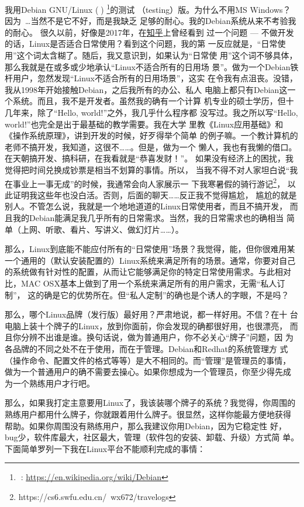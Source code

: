 我用Debian GNU/Linux ()%
\footnote{: \url{https://en.wikipedia.org/wiki/Debian}}的测试
（testing）版。为什么不用MS Windows？ 因为~\ldots 当然不是它不好，而是我缺乏
足够的耐心。我的Debian系统从来不考验我的耐心。
很久以前，好像是2017年，在\href{https://www.zhihu.com}{知乎}上曾经看到
过一个问题 --- 不做开发的话，Linux是否适合日常使用？看到这个问题，我的第
一反应就是，“日常使用”这个词太含糊了。随后，我又意识到，如果认为“日常使
用”这个词不够具体，那么我就是在或多或少地承认“Linux不适合所有的日用场
景”。做为一个Debian铁杆用户，忽然发现“Linux不适合所有的日用场景”，这实
在令我有点沮丧。没错，我从1998年开始接触Debian，之后我所有的办公、私人
电脑上都只有Debian这一个系统。而且，我不是开发者。虽然我的确有一个计算
机专业的硕士学历，但十几年来，除了“Hello, world!”之外，我几乎什么程序都
没写过。我之所以写“Hello, world!”也完全是出于最基础的教学需要。我在大学
里教《Linux应用基础》和《操作系统原理》，讲到开发的时候，好歹得举个简单
的例子嘛。一个教计算机的老师不搞开发，我知道，这很不……。但是，做为一个
懒人，我也有我懒的借口。在天朝搞开发、搞科研，在我看就是“恭喜发财！”。
如果没有经济上的困扰，我觉得把时间兑换成钞票是相当不划算的事情。所以，
当我不得不对人家坦白说“我在事业上一事无成”的时候，我通常会向人家展示一
下我寒暑假的骑行游记\footnote{https://cs6.swfu.edu.cn/~wx672/travelogs}，%
以此证明我这些年也没白活。否则，后面的聊天……反正我不觉得尴尬，
尴尬的就是别人。不管怎么说，我就是一个地地道道的Linux日常使用者，而且不搞开发，
而且我的Debian能满足我几乎所有的日常需求。当然，我的日常需求也的确相当
简单（上网、听歌、看片、写讲义、做幻灯片……）。

那么，Linux到底能不能应付所有的“日常使用”场景？我觉得，能，但你很难用某
一个通用的（默认安装配置的）Linux系统来满足所有的场景。通常，你要对自己
的系统做有针对性的配置，从而让它能够满足你的特定日常使用需求。与此相对
比，MAC OSX基本上做到了用一个系统来满足所有的用户需求，无需“私人订制”，
这的确是它的优势所在。但“私人定制”的确也是个诱人的字眼，不是吗？

那么，哪个Linux品牌（发行版）最好用？严肃地说，都一样好用。不信？在十
台电脑上装十个牌子的Linux，放到你面前，你会发现的确都很好用，也很漂亮，
而且你分辨不出谁是谁。换句话说，做为普通用户，你不必关心“牌子”问题，因
为各品牌的不同之处不在于使用，而在于管理。Debian和Redhat的系统管理方
式（操作命令、配置文件的格式等等）是大不相同的。而“管理”是管理员的事情，
做为一个普通用户的确不需要去操心。如果你想成为一个管理员，你至少得先成
为一个熟练用户才行吧。

那么，如果我打定主意要用Linux了，我该装哪个牌子的系统？我觉得，你周围的
熟练用户都用什么牌子，你就跟着用什么牌子。很显然，这样你能最方便地获得
帮助。如果你周围没有熟练用户，那么我建议你用Debian，因为它稳定性
好，bug少，软件库最大，社区最大，管理（软件包的安装、卸载、升级）方式简
单。下面简单罗列一下我在Linux平台不能顺利完成的事情：


